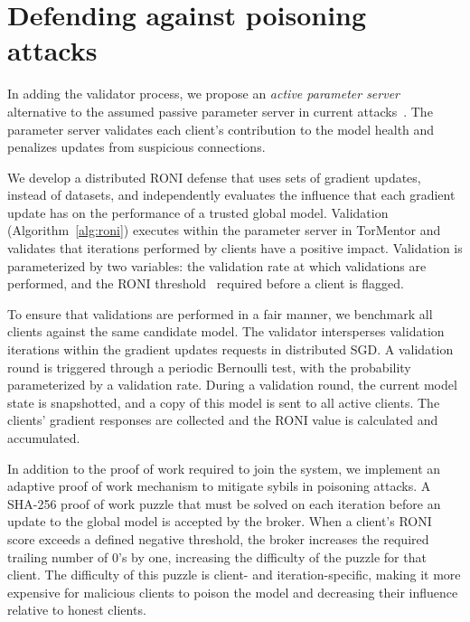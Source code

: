 \section{Defending against poisoning attacks}
\label{validator}

In adding the validator process, we propose an \emph{active parameter
server} alternative to the assumed passive parameter server in current
attacks~\cite{Hitaj:2017}. The parameter server validates each client's
contribution to the model health and penalizes updates from suspicious
connections. 

We develop a distributed RONI defense that uses sets of gradient
updates, instead of datasets, and independently evaluates the influence
that each gradient update has on the performance of a trusted global
model. Validation (Algorithm~\ref{alg:roni}) executes within the
parameter server in TorMentor and validates that iterations performed
by clients have a positive impact. Validation is parameterized by two
variables: the validation rate at which validations are performed, and
the RONI threshold~\cite{Barreno:2010} required before a client is
flagged.

To ensure that validations are performed in a fair manner, we benchmark
all clients against the same candidate model. The validator
intersperses validation iterations within the gradient updates requests
in distributed SGD. A validation round is triggered through a periodic 
Bernoulli test, with the probability parameterized by a validation
rate. During a validation round, the current model state is
snapshotted, and a copy of this model is sent to all active clients.
The clients' gradient responses are collected and the RONI value is
calculated and accumulated. 

In addition to the proof of work required to join the system, we
implement an adaptive proof of work mechanism to mitigate sybils in
poisoning attacks. A SHA-256 proof of work puzzle that must be solved
on each iteration before an update to the global model is accepted by
the broker. When a client's RONI score exceeds a defined negative
threshold, the broker increases the required trailing number of 0's by
one, increasing the difficulty of the puzzle for that client. The
difficulty of this puzzle is client- and iteration-specific, making it
more expensive for malicious clients to poison the model and decreasing
their influence relative to honest clients. 

